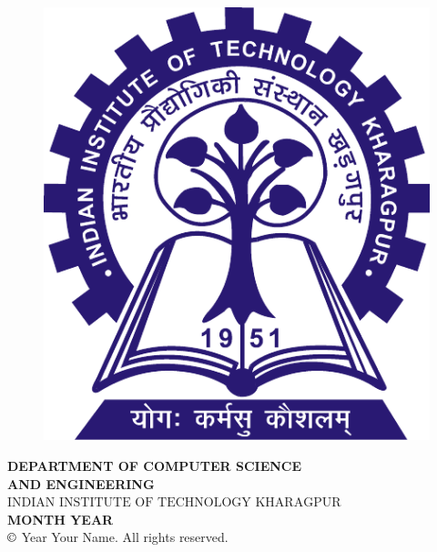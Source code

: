 \begin{center}
\begin{figure}[h]
	    \includegraphics[trim=0 0 0 0, clip, scale = 0.4] {1_front_matter/fig/kgpLogo}
    \end{figure}
	\begin{Spacing}{1.5}
	    \textbf{ DEPARTMENT OF COMPUTER SCIENCE \\AND ENGINEERING}
	    \textbf{ $\mbox{INDIAN INSTITUTE OF TECHNOLOGY KHARAGPUR}$}\\
	    \textbf{ MONTH YEAR}\\
		$\copyright $ Year Your Name. All rights reserved.
   	\end{Spacing}
\end{center}

\cleardoublepage
